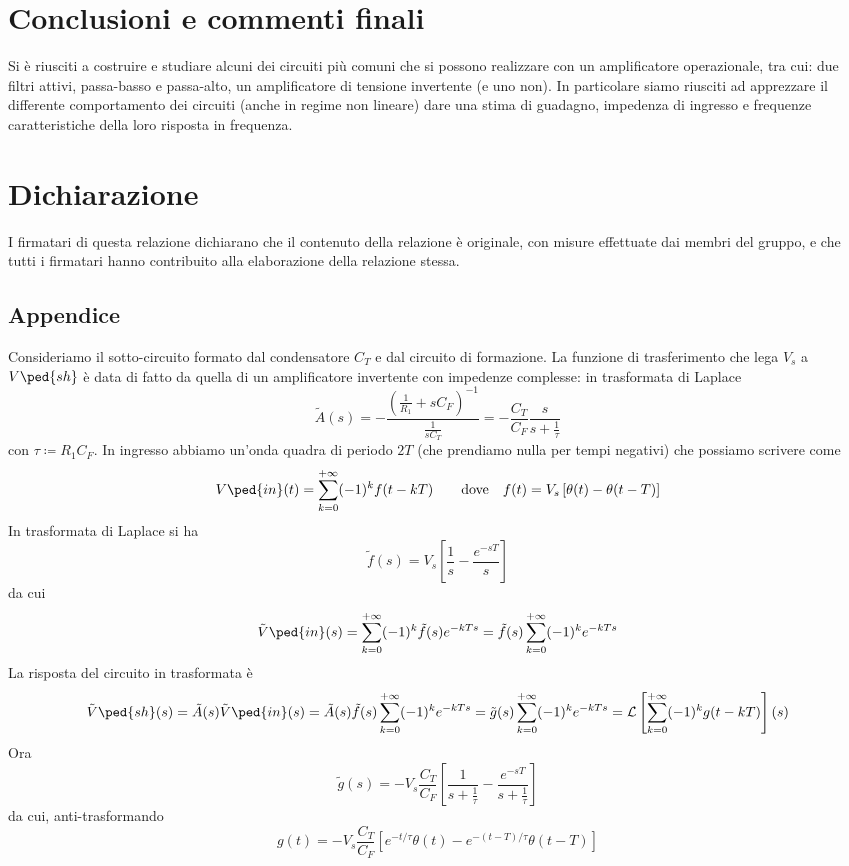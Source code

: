 \documentclass[10pt,a4paper]{article}
\begin{document}
\section*{Conclusioni e commenti finali}
Si è riusciti a costruire e studiare alcuni dei circuiti più comuni che si
possono realizzare con un amplificatore operazionale, tra cui: due filtri
attivi, passa-basso e passa-alto, un amplificatore di tensione invertente
(e uno non).
In particolare siamo riusciti ad apprezzare il differente comportamento dei
circuiti (anche in regime non lineare) dare una stima di guadagno, impedenza di
ingresso e frequenze caratteristiche della loro risposta in frequenza.

\section*{Dichiarazione}
I firmatari di questa relazione dichiarano che il contenuto della relazione \`e
originale, con misure effettuate dai membri del gruppo, e che tutti i firmatari
hanno contribuito alla elaborazione della relazione stessa.

\newpage
\subsection*{Appendice}
Consideriamo il sotto-circuito formato dal condensatore $C_T$ e dal circuito
di formazione. La funzione di trasferimento che lega $V_s$ a $V\ped{sh}$ è
data di fatto da quella di un amplificatore invertente con impedenze
complesse: in trasformata di Laplace
\[
\tilde{A}(s) = - \frac{\left(\frac{1}{R_1} + s 
C_F\right)^{-1}}{\frac{1}{s C_T}} = - \frac{C_T}{C_F} 
\frac{s}{s + \frac{1}{\tau}}
\]
con $ \tau \coloneqq R_1 C_F $. In ingresso abbiamo un'onda quadra di 
periodo $ 2T $ (che prendiamo nulla per tempi negativi) che possiamo scrivere 
come
\[
V\ped{in}(t) = \sum_{k=0}^{+\infty} (-1)^{k}f(t - kT)
\qquad \text{dove} \quad
f(t) = V_s \left[\theta(t) - \theta(t - T)\right]
\]
In trasformata di Laplace si ha
\[
\tilde{f}(s) = V_s\left[\frac{1}{s} - \frac{e^{-sT}}{s}\right]
\]
da cui
\[
\tilde{V}\ped{in}(s) = \sum_{k=0}^{+\infty} (-1)^{k} \tilde{f}(s) e^{-kTs} = 
\tilde{f}(s) \sum_{k=0}^{+\infty} (-1)^{k} e^{-kTs}
\]
La risposta del circuito in trasformata è
\[
  \tilde{V}\ped{sh}(s) = \tilde{A}(s) \tilde{V}\ped{in}(s) =  
\tilde{A}(s)\tilde{f}(s) \sum_{k=0}^{+\infty} (-1)^{k}e^{-kTs} = \tilde{g}(s) 
\sum_{k=0}^{+\infty} (-1)^{k}e^{-kTs} = \mathcal{L}\left[\sum_{k=0}^{+\infty} 
(-1)^{k}g(t - kT)\right](s)
\]
Ora
\[
  \tilde{g}(s) = - V_s \frac{C_T}{C_F} \left[\frac{1}{s + 
\frac{1}{\tau}} - \frac{e^{-sT}}{s + \frac{1}{\tau}}\right]
\]
da cui, anti-trasformando
\[
  g(t) = - V_s \frac{C_T}{C_F} \left[e^{-t/\tau}\theta(t) - 
e^{-(t-T)/\tau} \theta(t - T) \right]
\]
\end{document}
